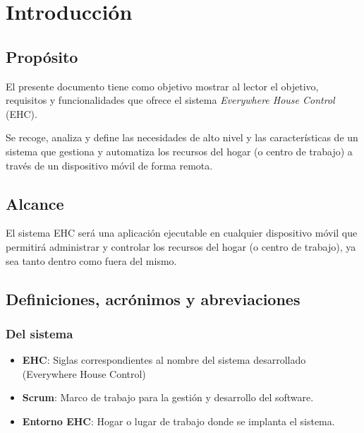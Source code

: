 \chapter{Introducción}

\section{Propósito}
    El presente documento tiene como objetivo mostrar al lector el objetivo, requisitos y funcionalidades que ofrece el sistema \textit{Everywhere House Control} (EHC). \par
    Se recoge, analiza y define las necesidades de alto nivel y las características de un sistema que gestiona y automatiza los recursos del hogar (o centro de trabajo) a través de un dispositivo móvil de forma remota.

\section{Alcance}
    El sistema EHC será una aplicación ejecutable en cualquier dispositivo móvil que permitirá administrar y controlar los recursos del hogar (o centro de trabajo), ya sea tanto dentro como fuera del mismo.

\section{Definiciones, acrónimos y abreviaciones}
    \subsection{Del sistema}
        \begin{itemize}
            \item { \bf EHC}: Siglas correspondientes al nombre del sistema desarrollado (Everywhere House Control)
            \item { \bf Scrum}: Marco de trabajo para la gestión y desarrollo del software.
            \item { \bf Entorno EHC}: Hogar o lugar de trabajo donde se implanta el sistema.
        \end{itemize}
